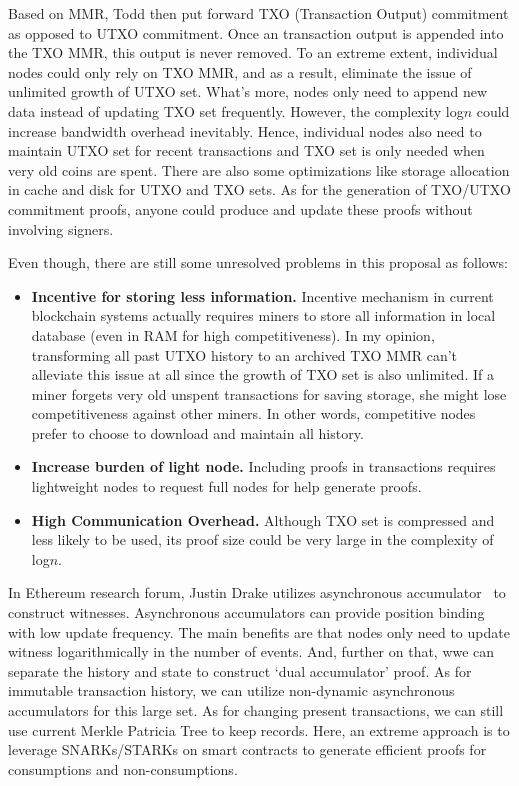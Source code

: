 \documentclass[conference]{IEEEtran}
\begin{document}
Based on MMR, Todd then put forward TXO (Transaction Output) commitment as opposed to UTXO commitment.
%
Once an transaction output is appended into the TXO MMR, this output is never removed.
%
To an extreme extent, individual nodes could only rely on TXO MMR, and as a result, eliminate the issue of unlimited growth of UTXO set.
%
What's more, nodes only need to append new data instead of updating TXO set frequently.
%
However, the complexity log\(n\) could increase bandwidth overhead inevitably.
%
Hence, individual nodes also need to maintain UTXO set for recent transactions and TXO set is only needed when very old coins are spent.
%
There are also some optimizations like storage allocation in cache and disk for UTXO and TXO sets.
%
As for the generation of TXO/UTXO commitment proofs, anyone could produce and update these proofs without involving signers.

Even though, there are still some unresolved problems in this proposal as follows:

\begin{itemize}
  \item \textbf{Incentive for storing less information.} 
        Incentive mechanism in current blockchain systems actually requires miners to store all information in local database (even in RAM for high competitiveness).
        In my opinion, transforming all past UTXO history to an archived TXO MMR can't alleviate this issue at all since the growth of TXO set is also unlimited.
        If a miner forgets very old unspent transactions for saving storage, she might lose competitiveness against other miners.
        In other words, competitive nodes prefer to choose to download and maintain all history.
  \item \textbf{Increase burden of light node.}
        Including proofs in transactions requires lightweight nodes to request full nodes for help generate proofs.
  \item \textbf{High Communication Overhead.}
        Although TXO set is compressed and less likely to be used, its proof size could be very large in the complexity of log$n$.
\end{itemize}

In Ethereum research forum, Justin Drake utilizes asynchronous accumulator~\cite{reyzin2016efficient} to construct witnesses. 
%
Asynchronous accumulators can provide position binding with low update frequency.
%
The main benefits are that nodes only need to update witness logarithmically in the number of events.
%
And, further on that, wwe can separate the history and state to construct `dual accumulator' proof.
%
As for immutable transaction history, we can utilize non-dynamic asynchronous accumulators for this large set.
%
As for changing present transactions, we can still use current Merkle Patricia Tree to keep records.
%
Here, an extreme approach is to leverage SNARKs/STARKs on smart contracts to generate efficient proofs for consumptions and non-consumptions. 
\end{document}
